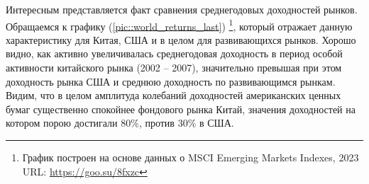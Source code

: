 \noindent Интересным представляется факт сравнения среднегодовых доходностей рынков. Обращаемся к графику (\ref{pic::world_returns_last}) \footnote{График построен на основе данных о MSCI Emerging Markets Indexes, 2023 URL: \url{https://goo.su/8fxzc}}, который отражает данную характеристику для Китая, США и в целом для развивающихся рынков. Хорошо видно, как активно увеличивалась среднегодовая доходность в период особой активности китайского рынка (2002 -- 2007), значительно превышая при этом доходность рынка США и среднюю доходность по развивающимся рынкам. Видим, что в целом амплитуда колебаний доходностей американских ценных бумаг существенно спокойнее фондового рынка Китай, значения доходностей на котором порою достигали 80\%, против 30\% в США.

